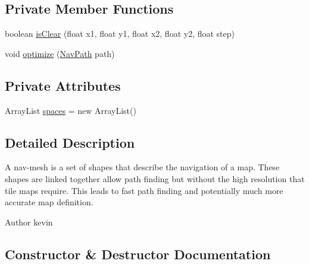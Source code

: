 \subsection*{Private Member Functions}
\begin{DoxyCompactItemize}
\item 
boolean \mbox{\hyperlink{classorg_1_1newdawn_1_1slick_1_1util_1_1pathfinding_1_1navmesh_1_1_nav_mesh_ad40443ffa577a525bf4ac169f2c1d0de}{is\+Clear}} (float x1, float y1, float x2, float y2, float step)
\item 
void \mbox{\hyperlink{classorg_1_1newdawn_1_1slick_1_1util_1_1pathfinding_1_1navmesh_1_1_nav_mesh_ae0b7a2d894c694edddba9e83e65f7824}{optimize}} (\mbox{\hyperlink{classorg_1_1newdawn_1_1slick_1_1util_1_1pathfinding_1_1navmesh_1_1_nav_path}{Nav\+Path}} path)
\end{DoxyCompactItemize}
\subsection*{Private Attributes}
\begin{DoxyCompactItemize}
\item 
Array\+List \mbox{\hyperlink{classorg_1_1newdawn_1_1slick_1_1util_1_1pathfinding_1_1navmesh_1_1_nav_mesh_a753a5f03305449a3c61d01a41c2fb129}{spaces}} = new Array\+List()
\end{DoxyCompactItemize}


\subsection{Detailed Description}
A nav-\/mesh is a set of shapes that describe the navigation of a map. These shapes are linked together allow path finding but without the high resolution that tile maps require. This leads to fast path finding and potentially much more accurate map definition.

\begin{DoxyAuthor}{Author}
kevin 
\end{DoxyAuthor}


\subsection{Constructor \& Destructor Documentation}
\mbox{\label{classorg_1_1newdawn_1_1slick_1_1util_1_1pathfinding_1_1navmesh_1_1_nav_mesh_a869d431a90904428d2ca7ab8060d2408}} 
